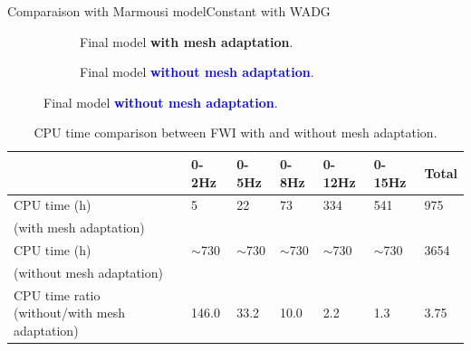 \begin{frame}[noframenumbering]{Comparaison with Marmousi model}{Constant with WADG}
    \vspace{-0.8cm}
  \setlength{\modelwidth}{6.0cm}
  \begin{figure}[!htbp]
    \renewcommand{\modelfile}{image/mesh_adapt/wadg_adapt_vp_80}
     \begin{subfigure}[!htbp]{0.5\textwidth}
        \vspace{0.5cm}
        \hspace{-0.5cm}
         \centering
         
                  \caption*{Final model \textcolor{\mygreen}{\textbf{with mesh adaptation}}.}
         \label{marmousi_mesh_padapt}
     \end{subfigure}
     \hspace{-1cm}
     \renewcommand{\modelfile}{image/mesh_adapt/wadg_classic_vp_80}
     \renewcommand{\cmapmin}{1500}
     \renewcommand{\cmapmax}{5000}
     \begin{subfigure}[!htbp]{0.5\textwidth}
         \centering
         
         \vspace{-0.6cm}
                  \caption*{Final model \textcolor{blue}{\textbf{without mesh adaptation}}.}
     \end{subfigure}
  \end{figure}

  \scriptsize
\begin{table}[!htbp]
\begin{tabular}{|m{4.0cm}|l|l|l|l|l|l|}
\hline
& 0-2Hz     & 0-5Hz     & 0-8Hz     & 0-12Hz    & 0-15Hz    & Total  \\ \hline
\rowcolor{green!30}
CPU time (h)          & 5         & 22        & 73        & 334       & 541       & 975   \\
\rowcolor{green!30}
(with mesh adaptation)          &          &         &         &        &        &    \\ \hline
\rowcolor{blue!30}
CPU time (h)       & $\sim$730 & $\sim$730 & $\sim$730 & $\sim$730 & $\sim$730 & 3654   \\
\rowcolor{blue!30}
(without mesh adaptation)       &  &  &  &  &  &    \\ \hline
CPU time ratio \newline (without/with mesh adaptation) &  146.0    &    33.2   &   10.0    &    2.2    &   1.3     & \cellcolor{red!30} 3.75   \\ \hline
\end{tabular}
\caption{CPU time comparison between FWI with and without mesh adaptation.}
\label{wadg_cpu_tab}
\end{table}
\end{frame}




